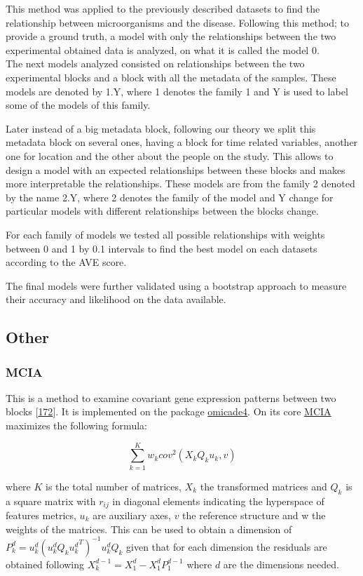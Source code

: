 \documentclass[
  12pt,
  a4paper,
  twoside,
  openright]{book}
\begin{document}
This method was applied to the previously described datasets to find the relationship between microorganisms and the disease.
Following this method; to provide a ground truth, a model with only the relationships between the two experimental obtained data is analyzed, on what it is called the model 0.\\
The next models analyzed consisted on relationships between the two experimental blocks and a block with all the metadata of the samples.
These models are denoted by 1.Y, where 1 denotes the family 1 and Y is used to label some of the models of this family.

Later instead of a big metadata block, following our theory we split this metadata block on several ones, having a block for time related variables, another one for location and the other about the people on the study.
This allows to design a model with an expected relationships between these blocks and makes more interpretable the relationships.
These models are from the family 2 denoted by the name 2.Y, where 2 denotes the family of the model and Y change for particular models with different relationships between the blocks change.

For each family of models we tested all possible relationships with weights between 0 and 1 by 0.1 intervals to find the best model on each datasets according to the AVE score.

The final models were further validated using a bootstrap approach to measure their accuracy and likelihood on the data available.

\hypertarget{other}{%
\subsection{Other}\label{other}}

\hypertarget{mcia}{%
\subsubsection{MCIA}\label{mcia}}

This is a method to examine covariant gene expression patterns between two blocks {[}\protect\hyperlink{ref-meng2014}{172}{]}.
It is implemented on the package \href{https://bioconductor.org/packages/omicade4}{omicade4}.
On its core \protect\hyperlink{acronyms_MCIA}{MCIA} maximizes the following formula:

\[
\sum_{k=1}^K w_k {cov}^2 (X_k Q_k u_k, v)
\]

where \(K\) is the total number of matrices, \(X_k\) the transformed matrices and \(Q_k\) is a square matrix with \(r_{ij}\) in diagonal elements indicating the hyperspace of features metrics, \(u_k\) are auxiliary axes, \(v\) the reference structure and w the weights of the matrices.
This can be used to obtain a dimension of \(P_k^d=u_k^d(u_k^d Q_k {u_k^d}^T)^{-1} u_k^d Q_k\) given that for each dimension the residuals are obtained following \(X_k^{d-1} = X_1^d- X_1^d P_1^{d-1}\) where \(d\) are the dimensions needed.
\end{document}
